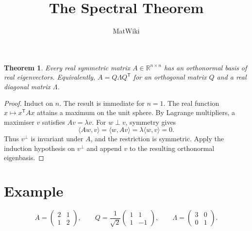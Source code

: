 \documentclass[11pt]{article}
\title{The Spectral Theorem}
\author{MatWiki}
\date{}
\newtheorem{theorem}{Theorem}
\newcommand{\R}{\mathbb{R}}
\begin{document}
\maketitle

\begin{theorem}
Every real symmetric matrix $A\in\R^{n\times n}$ has an orthonormal basis
of real eigenvectors. Equivalently, $A=Q\Lambda Q^{\mathsf T}$ for an
orthogonal matrix $Q$ and a real diagonal matrix $\Lambda$.
\end{theorem}

\begin{proof}
Induct on $n$. The result is immediate for $n=1$. The real function
$x\mapsto x^{\mathsf T}Ax$ attains a maximum on the unit sphere.
By Lagrange multipliers, a maximiser $v$ satisfies $Av=\lambda v$.
For $w\perp v$, symmetry gives
\[
  \langle Aw,v\rangle=\langle w,Av\rangle
  =\lambda\langle w,v\rangle=0.
\]
Thus $v^\perp$ is invariant under $A$, and the restriction is symmetric.
Apply the induction hypothesis on $v^\perp$ and append $v$ to the resulting
orthonormal eigenbasis.
\end{proof}

\section*{Example}
\[
  A=\begin{pmatrix}2&1\\1&2\end{pmatrix},\qquad
  Q=\frac{1}{\sqrt{2}}\begin{pmatrix}1&1\\1&-1\end{pmatrix},\qquad
  \Lambda=\begin{pmatrix}3&0\\0&1\end{pmatrix}.
\]

\end{document}
